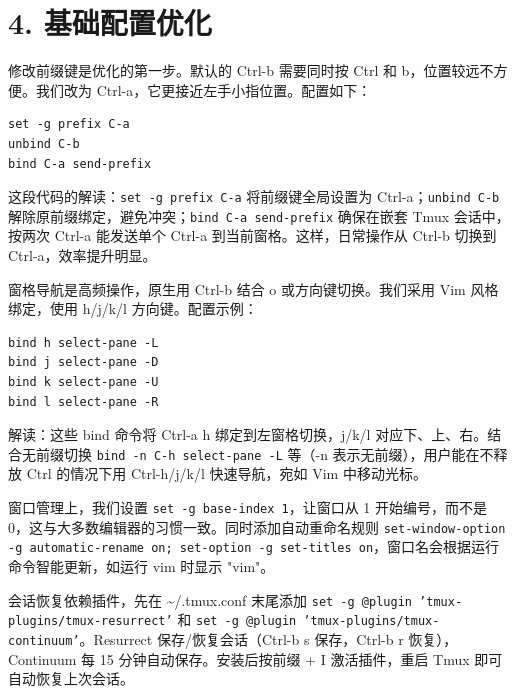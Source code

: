\chapter{4. 基础配置优化}
修改前缀键是优化的第一步。默认的 Ctrl-b 需要同时按 Ctrl 和 b，位置较远不方便。我们改为 Ctrl-a，它更接近左手小指位置。配置如下：\par
\begin{lstlisting}
set -g prefix C-a
unbind C-b
bind C-a send-prefix
\end{lstlisting}
这段代码的解读：\texttt{set -g prefix C-a} 将前缀键全局设置为 Ctrl-a；\texttt{unbind C-b} 解除原前缀绑定，避免冲突；\texttt{bind C-a send-prefix} 确保在嵌套 Tmux 会话中，按两次 Ctrl-a 能发送单个 Ctrl-a 到当前窗格。这样，日常操作从 Ctrl-b 切换到 Ctrl-a，效率提升明显。\par
窗格导航是高频操作，原生用 Ctrl-b 结合 o 或方向键切换。我们采用 Vim 风格绑定，使用 h/j/k/l 方向键。配置示例：\par
\begin{lstlisting}
bind h select-pane -L
bind j select-pane -D
bind k select-pane -U
bind l select-pane -R
\end{lstlisting}
解读：这些 bind 命令将 Ctrl-a h 绑定到左窗格切换，j/k/l 对应下、上、右。结合无前缀切换 \texttt{bind -n C-h select-pane -L} 等（-n 表示无前缀），用户能在不释放 Ctrl 的情况下用 Ctrl-h/j/k/l 快速导航，宛如 Vim 中移动光标。\par
窗口管理上，我们设置 \texttt{set -g base-index 1}，让窗口从 1 开始编号，而不是 0，这与大多数编辑器的习惯一致。同时添加自动重命名规则 \texttt{set-window-option -g automatic-rename on; set-option -g set-titles on}，窗口名会根据运行命令智能更新，如运行 vim 时显示 "vim"。\par
会话恢复依赖插件，先在 \~{}/.tmux.conf 末尾添加 \texttt{set -g @plugin 'tmux-plugins/tmux-resurrect'} 和 \texttt{set -g @plugin 'tmux-plugins/tmux-continuum'}。Resurrect 保存/恢复会话（Ctrl-b s 保存，Ctrl-b r 恢复），Continuum 每 15 分钟自动保存。安装后按前缀 + I 激活插件，重启 Tmux 即可自动恢复上次会话。\par
